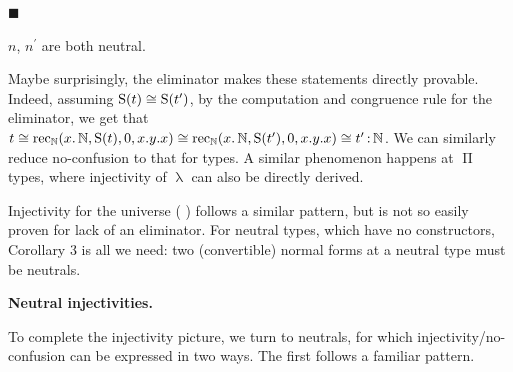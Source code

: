 \documentclass[10pt,a4paper]{amsart}
\begin{document}
 
 
\par\noindent  $\blacksquare$ 
 
$n$, $n^{\prime}$ are both neutral.\par
 
 
  
 
 
 
Maybe surprisingly, the eliminator makes these statements directly provable. Indeed, assuming $\operatorname{S}(t)\mathrel{\raisebox{-0.5pt}{$\cong$}}\operatorname{S}(t^{%
\prime})$, by the computation and congruence rule for the eliminator, we get that $t\mathrel{\raisebox{-0.5pt}{$\cong$}}\operatorname{rec}_{\operatorname{\mathbb%
{N}}}(x.\operatorname{\mathbb{N}},\operatorname{S}(t),0,x.y.x)\mathrel{%
\raisebox{-0.5pt}{$\cong$}}\operatorname{rec}_{\operatorname{\mathbb{N}}}(x.%
\operatorname{\mathbb{N}},\operatorname{S}(t^{\prime}),0,x.y.x)\mathrel{%
\raisebox{-0.5pt}{$\cong$}}t^{\prime}\operatorname{\mathrel{:}}\operatorname{%
\mathbb{N}}$. We can similarly reduce no-confusion to that for types. A similar phenomenon happens at $\operatorname{\Pi}$ types, where injectivity of $\operatorname{\lambda}$ can also be directly derived.\par
 
 
 
Injectivity for the universe ( ) follows a similar pattern, but is not so easily proven for lack of an eliminator. For neutral types, which have no constructors, Corollary 3 is all we need: two (convertible) normal forms at a neutral type must be neutrals.\par
 
 
 
 
\par\medskip\noindent\textbf{Neutral injectivities.}\par
 
 
To complete the injectivity picture, we turn to neutrals, for which injectivity/no-confusion can be expressed in two ways. The first follows a familiar pattern.\par
 
\end{document}

